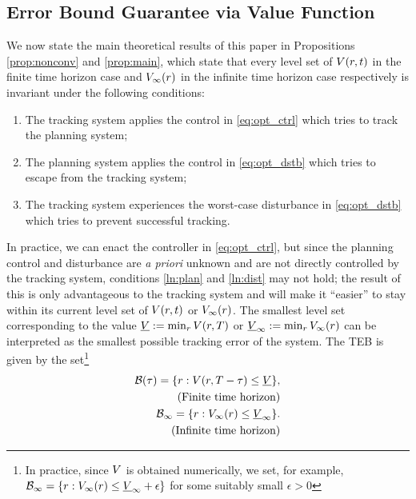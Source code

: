 \subsection{Error Bound Guarantee via Value Function} \label{sec:proofs}
We now state the main theoretical results of this paper in Propositions \ref{prop:nonconv} and \ref{prop:main}, which state that every level set of $V(r, t)$ in the finite time horizon case and $V_\infty(r)$ in the infinite time horizon case respectively is invariant under the following conditions:
\begin{enumerate}
  \item The tracking system applies the control in \eqref{eq:opt_ctrl} which tries to track the planning system;
  \item The planning system applies the control in \eqref{eq:opt_dstb} which tries to escape from the tracking system; \label{ln:plan}
  \item The tracking system experiences the worst-case disturbance in \eqref{eq:opt_dstb} which tries to prevent successful tracking. \label{ln:dist}
\end{enumerate}

In practice, we can enact the controller in \eqref{eq:opt_ctrl}, but since the planning control and disturbance are \textit{a priori} unknown and are not directly controlled by the tracking system, conditions \ref{ln:plan} and \ref{ln:dist} may not hold; the result of this is only advantageous to the tracking system and will make it ``easier'' to stay within its current level set of $V(r, t)$ or $V_\infty(r)$. 
The smallest level set corresponding to the value $\underline{V} := \min_{r} V(r,T)$ or $\underline{V}_\infty := \min_{r} V_\infty(r)$ can be interpreted as the smallest possible tracking error of the system. 
The TEB is given by the set\footnote{In practice, since $V$ is obtained numerically, we set, for example, $\mathcal B_\infty = \{r: V_\infty(r) \le \underline{V}_\infty + \epsilon\}$ for some suitably small $\epsilon>0$}
\begin{subequations} \label{eq:TEB}
  \begin{align}
  \mathcal B(\tau) = \{r: V(r, T - \tau) \le \underline{V}\}, \\
  \quad \text{(Finite time horizon)} \nonumber\\
  \mathcal B_\infty = \{r: V_\infty(r) \le \underline{V}_\infty\}. \\
  \quad \text{(Infinite time horizon)} \nonumber
  \end{align}
\end{subequations}

